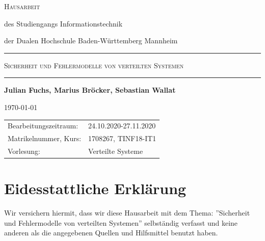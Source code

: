 \documentclass[12pt,a4paper,parskip=half]{scrreprt}
\begin{document}
\begin{titlepage}
{	}
	
	
	
	\bigskip
	
	
	
	\Large\textsc{Hausarbeit}
	
	
	
	\normalsize
	
	des Studiengangs Informationstechnik\par
	
	der Dualen Hochschule Baden-Württemberg Mannheim
	
	
	
	\rule{\textwidth}{.5mm}\bigskip
	
	
	
	\textsc{\large Sicherheit und Fehlermodelle von verteilten Systemen}	
	
	
	\rule{\textwidth}{.5mm}
	
	
	
	\vfill
	
	
	
	\par
	
	{\bfseries\large Julian Fuchs, Marius Bröcker, Sebastian Wallat}\par
	
	\today
	
	
	
	\vfill
	
	
	
	\small{%
		
		\begin{tabularx}{\textwidth}{@{}lX@{}}
			
			\toprule
			
			
			Bearbeitungszeitraum: & 24.10.2020-27.11.2020\\
			
			Matrikelnummer, Kurs: & 1708267, TINF18-IT1\\
			
			Vorlesung: & Verteilte Systeme \\
			
		\end{tabularx}
		
	}
	
	\cleardoublepage
	
\end{titlepage}


\newpage
{}

\chapter*{Eidesstattliche Erklärung}
\vspace{50pt}
Wir versichern hiermit, dass wir diese Hausarbeit mit dem Thema: ''Sicherheit und Fehlermodelle von verteilten Systemen'' selbständig verfasst und keine anderen als die angegebenen Quellen und Hilfsmittel benutzt haben.
\\
\\
\end{document}
